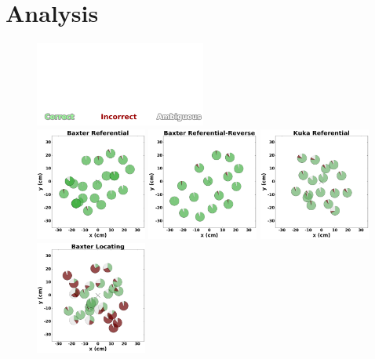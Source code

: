 \section{Analysis}
\label{analysis}

\begin{figure}[ht!]

    \centering
    \includegraphics[width=0.5\textwidth, trim={0 0 0 3.3in},clip ] {figures/labels.png}\\
    \includegraphics[width=0.325\textwidth ] {figures/baxter_Referential_.png}
    \includegraphics[width=0.325\textwidth ] {figures/baxter_Referential-Reverse_.png}
    \includegraphics[width=0.325\textwidth ]{figures/kuka_Referential_.png}
    \includegraphics[width=0.325\textwidth ]{figures/baxter_Locating_.png}

\end{figure}
